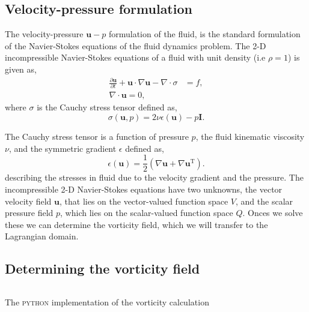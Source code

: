 \subsection{Velocity-pressure formulation}
The velocity-pressure $\mathbf{u}-p$ formulation of the fluid, is the standard formulation of the Navier-Stokes equations of the fluid dynamics problem. The 2-D incompressible Navier-Stokes equations of a fluid with unit density (i.e $\rho = 1$) is given as,
	\begin{subequations}
	\begin{align}
	\frac{\partial \mathbf{u}}{\partial t} + \mathbf{u}\cdot\nabla\mathbf{u} - \nabla \cdot \sigma &= f,\\
	\nabla \cdot \mathbf{u} = 0,
	\end{align}	
	\label{eq:2Dns}
	\end{subequations}
where $\sigma$ is the Cauchy stress tensor defined as,
	\begin{equation}
	\sigma(\mathbf{u},p) = 2\nu\epsilon(\mathbf{u}) - p\mathbf{I}.
	\end{equation}

The Cauchy stress tensor is a function of pressure $p$, the fluid kinematic viscosity $\nu$, and the symmetric gradient $\epsilon$ defined as,
	\begin{equation}
	\epsilon(\mathbf{u}) = \frac{1}{2} \left(\nabla \mathbf{u} + \nabla \mathbf{u}^{\mathrm{T}}\right).
	\label{eq:symGrad}
	\end{equation}
describing the stresses in fluid due to the velocity gradient and the pressure. The incompressible 2-D Navier-Stokes equations have two unknowns, the vector velocity field $\mathbf{u}$, that lies on the vector-valued function space $V$, and the scalar pressure field $p$, which lies on the scalar-valued function space $Q$. Onces we solve these we can determine the vorticity field, which we will transfer to the Lagrangian domain. 

\subsection{Determining the vorticity field}
\label{subsec:dtvf}
	\begin{listing}[t]
	\inputminted[fontseries=courier,obeytabs,fontsize=\footnotesize,mathescape,linenos,numbersep=5pt,frame=lines,framesep=2mm,xleftmargin=20mm,xrightmargin=20mm]{python}{figures/eulerian/vorticity.py}
	\caption{The \textsc{python} implementation of the vorticity calculation}
	\label{lst:pycode-vorticity}
	\end{listing}

